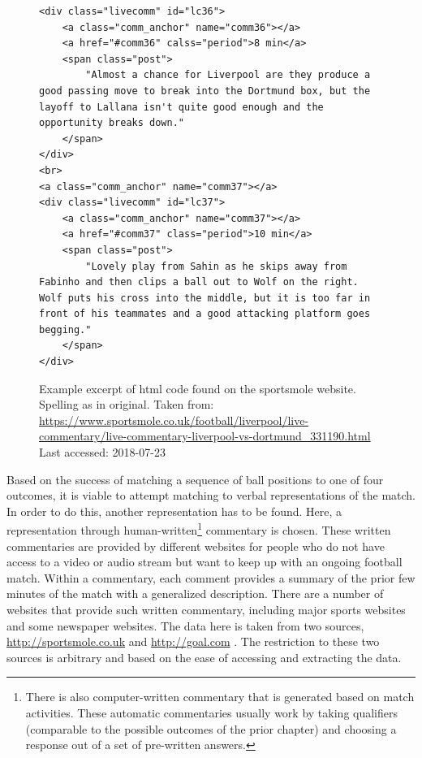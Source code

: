 \documentclass[10pt, a4paper]{UUThesisTemplate}
\begin{document}
\begin{figure}
\vspace{-1.8cm}
\hspace{0.7cm}
\begin{minipage}{6.8cm}
\begin{lstlisting}[language=HTML5]
<div class="livecomm" id="lc36">
    <a class="comm_anchor" name="comm36"></a>
    <a href="#comm36" calss="period">8 min</a>
    <span class="post">
        "Almost a chance for Liverpool are they produce a good passing move to break into the Dortmund box, but the layoff to Lallana isn't quite good enough and the opportunity breaks down."
    </span>
</div>
<br>
<a class="comm_anchor" name="comm37"></a>
<div class="livecomm" id="lc37">
    <a class="comm_anchor" name="comm37"></a>
    <a href="#comm37" class="period">10 min</a>
    <span class="post">
        "Lovely play from Sahin as he skips away from Fabinho and then clips a ball out to Wolf on the right. Wolf puts his cross into the middle, but it is too far in front of his teammates and a good attacking platform goes begging."
    </span>
</div>
\end{lstlisting}
\end{minipage}
\caption{Example excerpt of html code found on the sportsmole website. Spelling as in original. Taken from: \url{https://www.sportsmole.co.uk/football/liverpool/live-commentary/live-commentary-liverpool-vs-dortmund_331190.html} Last accessed: 2018-07-23}
\label{lst:htmlsportsmole}
\vspace{-1.6cm}
\end{figure}

Based on the success of matching a sequence of ball positions to one of four outcomes, it is viable to attempt matching to verbal representations of the match. In order to do this, another representation has to be found. Here, a representation through human-written\footnote{There is also computer-written commentary that is generated based on match activities. These automatic commentaries usually work by taking qualifiers (comparable to the possible outcomes of the prior chapter) and choosing a response out of a set of pre-written answers.} commentary is chosen. These written commentaries are provided by different websites for people who do not have access to a video or audio stream but want to keep up with an ongoing football match. Within a commentary, each comment provides a summary of the prior few minutes of the match with a generalized description. There are a number of websites that provide such written commentary, including major sports websites and some newspaper websites. The data here is taken from two sources, \url{http://sportsmole.co.uk} \cite{sportsmole} and \url{http://goal.com} \cite{goal}. The restriction to these two sources is arbitrary and based on the ease of accessing and extracting the data.
\end{document}
